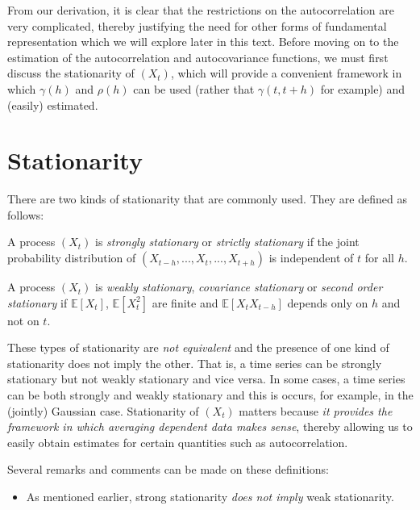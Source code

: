 \documentclass[]{book}
\providecommand{\tightlist}{%
  \setlength{\itemsep}{0pt}\setlength{\parskip}{0pt}}
\theoremstyle{definition}
\theoremstyle{definition}
\theoremstyle{definition}
\theoremstyle{remark}
\let\BeginKnitrBlock\begin \let\EndKnitrBlock\end
\begin{document}
From our derivation, it is clear that the restrictions on the
autocorrelation are very complicated, thereby justifying the need for
other forms of fundamental representation which we will explore later in
this text. Before moving on to the estimation of the autocorrelation and
autocovariance functions, we must first discuss the stationarity of
\((X_t)\), which will provide a convenient framework in which
\(\gamma(h)\) and \(\rho(h)\) can be used (rather that \(\gamma(t,t+h)\)
for example) and (easily) estimated.

\hypertarget{stationary}{%
\section{Stationarity}\label{stationary}}

There are two kinds of stationarity that are commonly used. They are
defined as follows:

\BeginKnitrBlock{definition}
\protect\hypertarget{def:strongstationarity}{}{\label{def:strongstationarity}
}A process \((X_t)\) is \emph{strongly stationary} or \emph{strictly
stationary} if the joint probability distribution of
\((X_{t-h}, ..., X_t, ..., X_{t+h})\) is independent of \(t\) for all
\(h\).
\EndKnitrBlock{definition}

\BeginKnitrBlock{definition}
\protect\hypertarget{def:weakstationarity}{}{\label{def:weakstationarity} }A
process \((X_t)\) is \emph{weakly stationary}, \emph{covariance
stationary} or \emph{second order stationary} if \(\mathbb{E}[X_t]\),
\(\mathbb{E}[X_t^2]\) are finite and \(\mathbb{E}[X_t X_{t-h}]\) depends
only on \(h\) and not on \(t\).
\EndKnitrBlock{definition}

These types of stationarity are \emph{not equivalent} and the presence
of one kind of stationarity does not imply the other. That is, a time
series can be strongly stationary but not weakly stationary and vice
versa. In some cases, a time series can be both strongly and weakly
stationary and this is occurs, for example, in the (jointly) Gaussian
case. Stationarity of \((X_t)\) matters because \emph{it provides the
framework in which averaging dependent data makes sense}, thereby
allowing us to easily obtain estimates for certain quantities such as
autocorrelation.

Several remarks and comments can be made on these definitions:

\begin{itemize}
\tightlist
\item
  As mentioned earlier, strong stationarity \emph{does not imply} weak
  stationarity.
\end{itemize}
\end{document}
